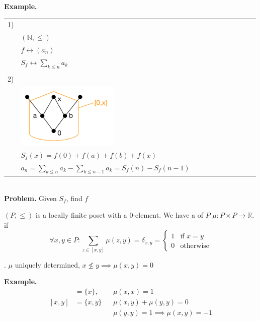 \textbf{Example.}

\begin{tabular}{ll}
  1) & \\
     & $(\mathbb{N}, \leq)$\\
     & $f \leftrightarrow (a_n)$\\
     & $S_f \leftrightarrow \sum_{k\leq n} a_k$\\\\

  2) & \\
     & \includegraphics[width=0.4\textwidth]
        {02_higher_combinatorics/pics/LatticeInterval}\\
     & $S_f(x) = f(0) + f(a) + f(b) + f(x) $\\
     & $a_n = \sum_{k \leq n} a_k - \sum_{k \leq n-1} a_k =
              S_f(n) - S_f(n-1)$\\
\end{tabular}~\\

\textbf{Problem.}
Given $S_f$, find $f$

\begin{definition}
$(P, \leq)$ is a locally finite poset with a 0-element.
We have a  of $P$ $\mu: P\times P \rightarrow \mathbb{R}$.
if
\[
  \forall x,y \in P: \sum_{z\in [x, y]} \mu(z,y) = \delta_{x,y} =
    \begin{cases}
      1 & \text{if } x = y \\
      0 & \text{otherwise}
    \end{cases}
\]
\end{definition}

\Remark.
$\mu$ uniquely determined, $x \not\leq y \implies \mu(x,y) = 0$

\textbf{Example.}
\begin{align*}
  [x,x] & = \{x\}, && \mu(x,x) = 1 \\
  [x,y] &= \{x,y\} && \mu(x,y) + \mu(y,y) = 0 \\
        &          && \mu(y,y) = 1 \implies \mu(x,y) = -1 \\
\end{align*}

